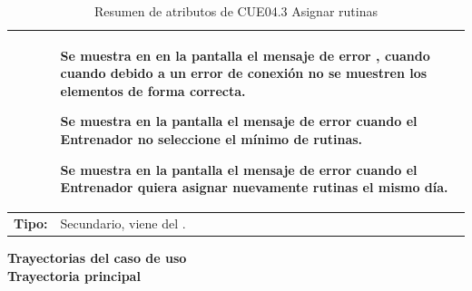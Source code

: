 \begin{table}[H]
\centering
\begin{tabular}{| c | p{12 cm} |}						
\hline
				& \vspace{-2mm}	%
					\begin{compactitem}
						\setlength\itemsep{-0.25em}
						\item  Se muestra en en la pantalla \nameref{pant:IUE04.3} el mensaje de error \nameref{msj:MSG24}, cuando cuando debido a un error de conexión no se muestren los elementos de forma correcta.
						\item Se muestra en la pantalla \nameref{pant:IUE04.3} el mensaje de error \nameref{msj:MSG18} cuando el Entrenador no seleccione el mínimo de rutinas.
						\item Se muestra en la pantalla \nameref{pant:IUE04} el mensaje de error \nameref{msj:MSG23} cuando el Entrenador quiera asignar nuevamente rutinas el mismo día.
					\end{compactitem}\\
\hline
\textbf{Tipo:} & Secundario, viene del \nameref{cu:CUE04}.\\
\hline	
\end{tabular}
\caption{Resumen de atributos de CUE04.3 Asignar rutinas}
\label{tabla:CUE043}
\end{table} 

\textbf{\textcolor[rgb]{0, 0, 0.545098}{Trayectorias del caso de uso}} \\

\textbf{\large{Trayectoria principal}}

